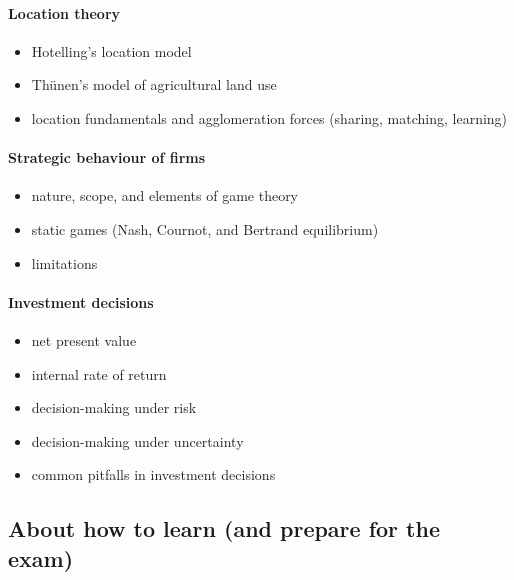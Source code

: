 \documentclass[
  12pt,
  oneside]{book}
\providecommand{\tightlist}{%
  \setlength{\itemsep}{0pt}\setlength{\parskip}{0pt}}
\theoremstyle{definition}
\theoremstyle{definition}
\theoremstyle{definition}
\theoremstyle{definition}
\theoremstyle{remark}
\begin{document}
\hypertarget{location-theory}{%
\paragraph*{Location theory}\label{location-theory}}

\begin{itemize}
\tightlist
\item
  Hotelling's location model
\item
  Thünen's model of agricultural land use
\item
  location fundamentals and agglomeration forces (sharing, matching, learning)
\end{itemize}

\hypertarget{strategic-behaviour-of-firms}{%
\paragraph*{Strategic behaviour of firms}\label{strategic-behaviour-of-firms}}

\begin{itemize}
\tightlist
\item
  nature, scope, and elements of game theory
\item
  static games (Nash, Cournot, and Bertrand equilibrium)
\item
  limitations
\end{itemize}

\hypertarget{investment-decisions}{%
\paragraph*{Investment decisions}\label{investment-decisions}}

\begin{itemize}
\tightlist
\item
  net present value
\item
  internal rate of return
\item
  decision-making under risk
\item
  decision-making under uncertainty
\item
  common pitfalls in investment decisions
\end{itemize}

\hypertarget{about-how-to-learn-and-prepare-for-the-exam}{%
\subsection*{About how to learn (and prepare for the exam)}\label{about-how-to-learn-and-prepare-for-the-exam}}
\end{document}
